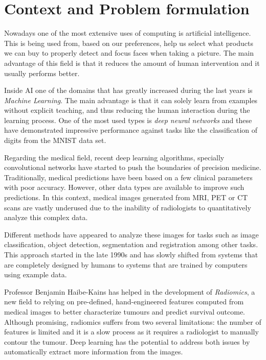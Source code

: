 
\section{Context and Problem formulation}

Nowadays one of the most extensive uses of computing is artificial intelligence. This is being
used from, based on our preferences, help us select what products we can buy to properly detect
and focus faces when taking a picture. The main advantage of this field is that it reduces the
amount of human intervention and it usually performs better.

Inside AI one of the domains that has greatly increased during the last years is 
\emph{Machine Learning}. The main advantage is that it can solely learn from examples without 
explicit teaching, and thus reducing the human interaction during the learning process. One of the 
most used types is \emph{deep neural networks} and these have demonstrated impressive performance 
against tasks like the classification of digits from the MNIST data set.
~\cites{MNIST}{empirical-evaluation-deep-architectures}

Regarding the medical field, recent deep learning algorithms, specially convolutional networks 
have started to push the boundaries of precision medicine. 
Traditionally, medical predictions have been based on a few clinical parameters with poor accuracy.
However, other data types are available to improve such predictions. In this context, medical
images generated from MRI, PET or CT scans are vastly underused due to the inability of radiologists
to quantitatively analyze this complex data.

Different methods have appeared to analyze these images for tasks such as
image classification, object detection, segmentation and registration among other tasks. This
approach started in the late 1990s and has slowly shifted from systems that are completely designed
by humans to systems that are trained by computers using example data. 
~\cite{survey-deep-learning}

Professor Benjamin Haibe-Kains has helped in the development of \emph{Radiomics}, a new field to
relying on pre-defined, hand-engineered features computed from medical images to better 
characterize tumours and predict survival outcome. Although promising, radiomics suffers from 
two several limitations: the number of features is limited and it is a slow process as it requires
a radiologist to manually contour the tumour. Deep learning has the potential to address both issues
by automatically extract more information from the images.
~\cite{radiomics-ML-classifiers}

